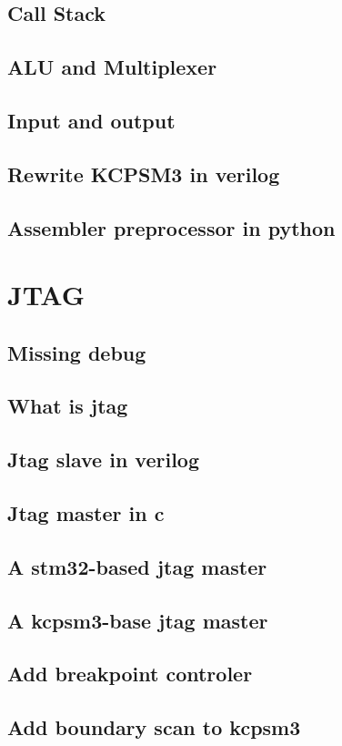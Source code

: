 \documentclass[a4paper]{book}
\begin{document}
\begin{CJK*}{UTF8}{song}
\chapter{Call Stack}
\chapter{ALU and Multiplexer}
\chapter{Input and output}
\chapter{Rewrite KCPSM3 in verilog}
\chapter{Assembler preprocessor in python}

\part{JTAG}
\chapter{Missing debug}
\chapter{What is jtag}
\chapter{Jtag slave in verilog}
\chapter{Jtag master in c}
\chapter{A stm32-based jtag master}
\chapter{A kcpsm3-base jtag master}
\chapter{Add breakpoint controler}
\chapter{Add boundary scan to kcpsm3}

\end{CJK*}
\end{document}
